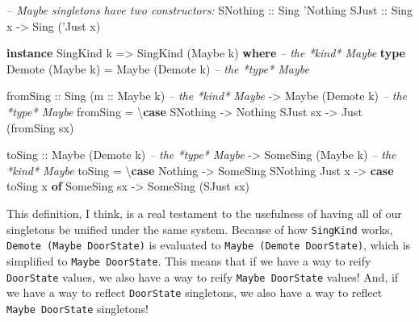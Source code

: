 \documentclass[]{article}
\newenvironment{Shaded}{}{}
\newcommand{\KeywordTok}[1]{\textcolor[rgb]{0.00,0.44,0.13}{\textbf{#1}}}
\newcommand{\DataTypeTok}[1]{\textcolor[rgb]{0.56,0.13,0.00}{#1}}
\newcommand{\CharTok}[1]{\textcolor[rgb]{0.25,0.44,0.63}{#1}}
\newcommand{\CommentTok}[1]{\textcolor[rgb]{0.38,0.63,0.69}{\textit{#1}}}
\newcommand{\OtherTok}[1]{\textcolor[rgb]{0.00,0.44,0.13}{#1}}
\newcommand{\FunctionTok}[1]{\textcolor[rgb]{0.02,0.16,0.49}{#1}}
\newcommand{\NormalTok}[1]{#1}
\begin{document}
\begin{Shaded}
\begin{Highlighting}[]
\CommentTok{-- Maybe singletons have two constructors:}
\DataTypeTok{SNothing}\OtherTok{ ::} \DataTypeTok{Sing} \CharTok{'Nothing}
\DataTypeTok{SJust}\OtherTok{    ::} \DataTypeTok{Sing}\NormalTok{ x }\OtherTok{->} \DataTypeTok{Sing}\NormalTok{ (}\CharTok{'Just x)}

\KeywordTok{instance} \DataTypeTok{SingKind}\NormalTok{ k }\OtherTok{=>} \DataTypeTok{SingKind}\NormalTok{ (}\DataTypeTok{Maybe}\NormalTok{ k) }\KeywordTok{where}     \CommentTok{-- the *kind* Maybe}
    \KeywordTok{type} \DataTypeTok{Demote}\NormalTok{ (}\DataTypeTok{Maybe}\NormalTok{ k) }\FunctionTok{=} \DataTypeTok{Maybe}\NormalTok{ (}\DataTypeTok{Demote}\NormalTok{ k)        }\CommentTok{-- the *type* Maybe}

\NormalTok{    fromSing}
\OtherTok{        ::} \DataTypeTok{Sing}\NormalTok{ (}\OtherTok{m ::} \DataTypeTok{Maybe}\NormalTok{ k)        }\CommentTok{-- the *kind* Maybe}
        \OtherTok{->} \DataTypeTok{Maybe}\NormalTok{ (}\DataTypeTok{Demote}\NormalTok{ k)           }\CommentTok{-- the *type* Maybe}
\NormalTok{    fromSing }\FunctionTok{=}\NormalTok{ \textbackslash{}}\KeywordTok{case}
        \DataTypeTok{SNothing} \OtherTok{->} \DataTypeTok{Nothing}
        \DataTypeTok{SJust}\NormalTok{ sx }\OtherTok{->} \DataTypeTok{Just}\NormalTok{ (fromSing sx)}

\NormalTok{    toSing}
\OtherTok{        ::} \DataTypeTok{Maybe}\NormalTok{ (}\DataTypeTok{Demote}\NormalTok{ k)             }\CommentTok{-- the *type* Maybe}
        \OtherTok{->} \DataTypeTok{SomeSing}\NormalTok{ (}\DataTypeTok{Maybe}\NormalTok{ k)           }\CommentTok{-- the *kind* Maybe}
\NormalTok{    toSing }\FunctionTok{=}\NormalTok{ \textbackslash{}}\KeywordTok{case}
        \DataTypeTok{Nothing} \OtherTok{->} \DataTypeTok{SomeSing} \DataTypeTok{SNothing}
        \DataTypeTok{Just}\NormalTok{ x  }\OtherTok{->} \KeywordTok{case}\NormalTok{ toSing x }\KeywordTok{of}
          \DataTypeTok{SomeSing}\NormalTok{ sx }\OtherTok{->} \DataTypeTok{SomeSing}\NormalTok{ (}\DataTypeTok{SJust}\NormalTok{ sx)}
\end{Highlighting}
\end{Shaded}

This definition, I think, is a real testament to the usefulness of having all of
our singletons be unified under the same system. Because of how
\texttt{SingKind} works, \texttt{Demote\ (Maybe\ DoorState)} is evaluated to
\texttt{Maybe\ (Demote\ DoorState)}, which is simplified to
\texttt{Maybe\ DoorState}. This means that if we have a way to reify
\texttt{DoorState} values, we also have a way to reify \texttt{Maybe\ DoorState}
values! And, if we have a way to reflect \texttt{DoorState} singletons, we also
have a way to reflect \texttt{Maybe\ DoorState} singletons!
\end{document}
